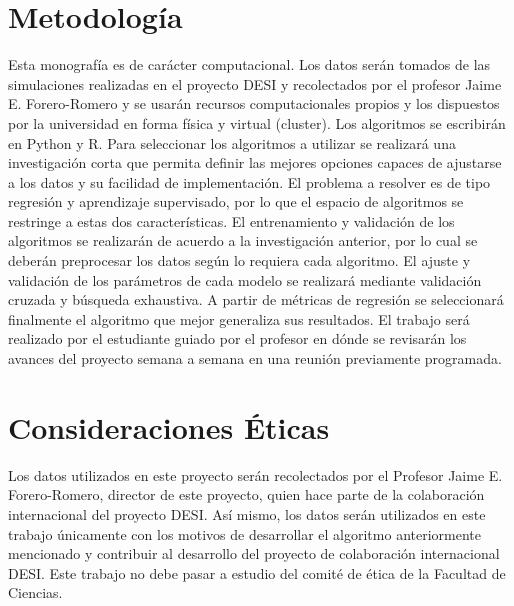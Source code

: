 \documentclass[12pt]{article}
\begin{document}
\section{Metodología}




Esta monografía es de carácter computacional. Los datos serán tomados
de las simulaciones realizadas en el proyecto DESI y recolectados por
el profesor Jaime E. Forero-Romero y se usarán recursos
computacionales propios y los dispuestos por la universidad en forma
física y virtual (cluster). Los algoritmos se escribirán en Python y R. 
Para seleccionar los algoritmos a utilizar se realizará una investigación corta que permita definir las mejores
opciones capaces de ajustarse a los datos y su facilidad de
implementación. El problema a resolver es de tipo regresión y
aprendizaje supervisado, por lo que el espacio de algoritmos se
restringe a estas dos características. El entrenamiento y validación
de los algoritmos se realizarán de acuerdo a la investigación
anterior, por lo cual se deberán preprocesar los datos según lo
requiera cada algoritmo. El ajuste y validación de los parámetros de
cada modelo se realizará mediante validación cruzada y búsqueda
exhaustiva. A partir de métricas de regresión se seleccionará
finalmente el algoritmo que mejor generaliza sus resultados. El
trabajo será realizado por el estudiante guiado por el profesor en
dónde se revisarán los avances del proyecto semana a semana en una
reunión previamente programada. 

\section{Consideraciones Éticas}
Los datos utilizados en este proyecto serán recolectados por el Profesor Jaime E. Forero-Romero, director de 
este proyecto, quien hace parte de la colaboración internacional del proyecto DESI. Así mismo, los datos serán utilizados
en este trabajo únicamente con los motivos de desarrollar el algoritmo anteriormente mencionado y contribuir 
al desarrollo del proyecto de colaboración internacional DESI. Este trabajo no debe pasar a estudio del comité de
ética de la Facultad de Ciencias. 
\end{document}

